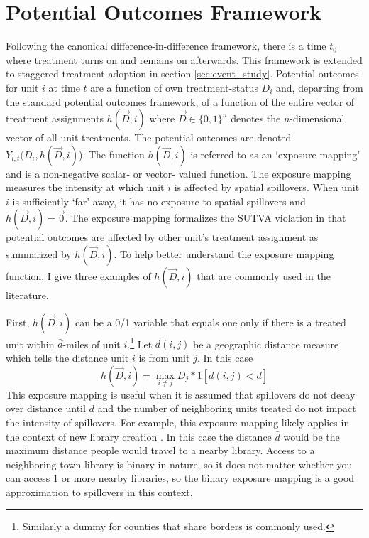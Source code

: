 \documentclass[11pt]{article}
\begin{document}
\section{Potential Outcomes Framework}
\label{sec:po_framework}

Following the canonical difference-in-difference framework, there is a time $t_0$ where treatment turns on and remains on afterwards. This framework is extended to staggered treatment adoption in section \ref{sec:event_study}. Potential outcomes for unit $i$ at time $t$ are a function of own treatment-status $D_i$ and, departing from the standard potential outcomes framework, of a function of the entire vector of treatment assignments $h(\vec{D}, i)$ where $\vec{D} \in \{0,1 \}^n$ denotes the $n$-dimensional vector of all unit treatments. The potential outcomes are denoted $Y_{i,t}(D_i, h(\vec{D}, i)$). The function $h(\vec{D}, i)$ is referred to as an `exposure mapping' and is a non-negative scalar- or vector- valued function. The exposure mapping measures the intensity at which unit $i$ is affected by spatial spillovers. When unit $i$ is sufficiently `far' away, it has no exposure to spatial spillovers and $h(\vec{D}, i) = \vec{0}$. The exposure mapping formalizes the SUTVA violation in that potential outcomes are affected by other unit's treatment assignment as summarized by $h(\vec{D}, i)$. To help better understand the exposure mapping function, I give three examples of $h(\vec{D}, i)$ that are commonly used in the literature.

\begin{example}
    First, $h(\vec{D}, i)$ can be a 0/1 variable that equals one only if there is a treated unit within $\bar{d}$-miles of unit $i$.\footnote{Similarly a dummy for counties that share borders is commonly used.} Let $d(i,j)$ be a geographic distance measure which tells the distance unit $i$ is from unit $j$.  In this case \begin{equation}\label{eq:h_within}
        h(\vec{D}, i) = \max_{i \neq j} D_j * 1[ d(i,j) < \bar{d} ] 
    \end{equation}
    This exposure mapping is useful when it is assumed that spillovers do not decay over distance until $\bar{d}$ and the number of neighboring units treated do not impact the intensity of spillovers. For example, this exposure mapping likely applies in the context of new library creation \citep{Berkes_Nencka_2020}. In this case the distance $\bar{d}$ would be the maximum distance people would travel to a nearby library. Access to a neighboring town library is binary in nature, so it does not matter whether you can access 1 or more nearby libraries, so the binary exposure mapping is a good approximation to spillovers in this context.  
\end{example}
    
\end{document}
